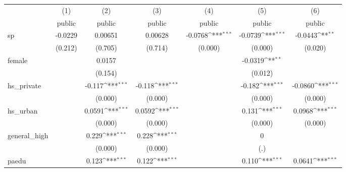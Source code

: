 {
\def\sym#1{\ifmmode^{#1}\else\(^{#1}\)\fi}
\begin{tabular}{l*{6}{c}}
\hline\hline
            &\multicolumn{1}{c}{(1)}&\multicolumn{1}{c}{(2)}&\multicolumn{1}{c}{(3)}&\multicolumn{1}{c}{(4)}&\multicolumn{1}{c}{(5)}&\multicolumn{1}{c}{(6)}\\
            &\multicolumn{1}{c}{public}&\multicolumn{1}{c}{public}&\multicolumn{1}{c}{public}&\multicolumn{1}{c}{public}&\multicolumn{1}{c}{public}&\multicolumn{1}{c}{public}\\
\hline
sp          &     -0.0229         &     0.00651         &     0.00628         &     -0.0768\sym{***}&     -0.0739\sym{***}&     -0.0443\sym{**} \\
            &     (0.212)         &     (0.705)         &     (0.714)         &     (0.000)         &     (0.000)         &     (0.020)         \\
[1em]
female      &                     &      0.0157         &                     &                     &     -0.0319\sym{**} &                     \\
            &                     &     (0.154)         &                     &                     &     (0.012)         &                     \\
[1em]
hs\_private  &                     &      -0.117\sym{***}&      -0.118\sym{***}&                     &      -0.182\sym{***}&     -0.0860\sym{***}\\
            &                     &     (0.000)         &     (0.000)         &                     &     (0.000)         &     (0.000)         \\
[1em]
hs\_urban    &                     &      0.0591\sym{***}&      0.0592\sym{***}&                     &       0.131\sym{***}&      0.0968\sym{***}\\
            &                     &     (0.000)         &     (0.000)         &                     &     (0.000)         &     (0.000)         \\
[1em]
general\_high&                     &       0.229\sym{***}&       0.228\sym{***}&                     &           0         &                     \\
            &                     &     (0.000)         &     (0.000)         &                     &         (.)         &                     \\
[1em]
paedu       &                     &       0.123\sym{***}&       0.122\sym{***}&                     &       0.110\sym{***}&      0.0641\sym{***}\\

\end{tabular}}

